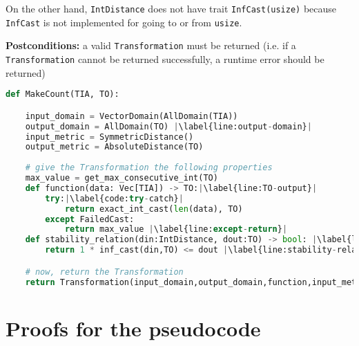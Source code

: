 \documentclass[11pt,letterpaper]{article}
\newcommand{\question}[1]{\textcolor{red}{\textbf{Question:} #1}}
\theoremstyle{definition}
\begin{document}
\begin{itemize}
\begin{itemize}
        On the other hand, \texttt{IntDistance} does not have trait \texttt{InfCast(usize)} because \texttt{InfCast} is not implemented for going to or from \texttt{usize}.
        
    \end{itemize}
    
\end{itemize}

\textbf{Postconditions:} a valid \texttt{Transformation} must be returned (i.e. if a \texttt{Transformation} cannot be returned successfully, a runtime error should be returned)

\begin{lstlisting}[language = Python, escapechar=|]
def MakeCount(TIA, TO):

    input_domain = VectorDomain(AllDomain(TIA))
    output_domain = AllDomain(TO) |\label{line:output-domain}|
    input_metric = SymmetricDistance()
    output_metric = AbsoluteDistance(TO)
    
    # give the Transformation the following properties
    max_value = get_max_consecutive_int(TO) 
    def function(data: Vec[TIA]) -> TO:|\label{line:TO-output}|
        try:|\label{code:try-catch}|
            return exact_int_cast(len(data), TO)
        except FailedCast:
            return max_value |\label{line:except-return}|
    def stability_relation(din:IntDistance, dout:TO) -> bool: |\label{line:din-dout-type}|
        return 1 * inf_cast(din,TO) <= dout |\label{line:stability-relation}|

    # now, return the Transformation
    return Transformation(input_domain,output_domain,function,input_metric,output_metric,stability_relation)

\end{lstlisting}

\section{Proofs for the pseudocode}
\end{document}

